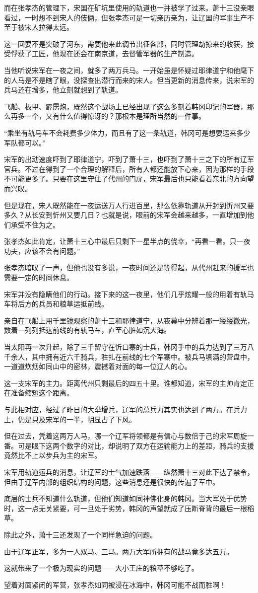 而在张孝杰的管理下，宋国在矿坑里使用的轨道也一并被学了过来。萧十三没亲眼看过，一时想不到宋人的伎俩，但张孝杰可是一切亲历亲为，让辽国的军事生产不至于被宋人拉得太远。

这一回要不是突破了河东，需要他来此调节出征各部，同时管理劫掠来的收获，接受俘获了工匠，他现在还会在南京道，去督管军器的生产制造。

当他听说宋军在一夜之间，就多了两万兵马。一开始虽是怀疑过耶律道宁和他麾下的人马是不是瞎了眼，没探查出潜行而来的宋人。但当更新的消息传来，说宋军的兵马还在增多，他立刻就想到了轨道。

飞船、板甲、霹雳炮，既然这个战场上已经出现了这么多刻着韩冈印记的军器，那么再多一个，又有什么值得惊讶的？那根本是理所当然的一件事。

“乘坐有轨马车不会耗费多少体力，而且有了这一条轨道，韩冈可是想要运来多少军队都可以。”

宋军的出动速度吓到了耶律道宁，吓到了萧十三，也吓到了萧十三之下的所有辽军官兵。不过在得到了一个合理的解释后，所有人都还能放下心来，因为那样的手段不可能更多了。只要在这里守住了代州的门扉，宋军最后也只能看着东北的方向望而兴叹。

但是现在，宋人既然能在一夜运送万人行进百里，那么依靠轨道从开封到忻州又要多久？从长安到忻州又要几日？也就是说，眼前的宋军会越来越多，一直增加到他们承受不住为之。

张孝杰如此肯定，让萧十三心中最后只剩下一星半点的侥幸，“再看一看。只一夜功夫，应该不会有问题。”

张孝杰暗叹了一声，但他也没有多说，一夜时间还是等得起，从代州赶来的援军也需要一定的时间休息。

宋军并没有隐瞒他们的行动。接下来的这一夜里，他们几乎炫耀一般的用着有轨马车将后方的兵员和粮草运抵前线。

亲自在飞船上用千里镜观察的萧十三和耶律道宁，从夜幕中分辨着那一缕缕微光，数着一列列抵达前线的有轨马车，直至心脏如沉大海。

当太阳再一次升起，除了三千留守在忻口寨的士兵，韩冈手中的兵力达到了三万八千余人，其中拥有近六千骑兵，驻扎在前线的七个军寨中。被兵马填满的营盘中，一道道炊烟如同山中的密林，震撼着对面的每一位辽人的心。

这一支宋军的主力。距离代州只剩最后的四五十里。谁都知道，宋军的主帅肯定正在准备缩短这个距离。

与此相对应，经过了昨日的大举增兵，辽军的总兵力其实也达到了两万。在兵力上，仍是只及宋军的一半，明显占了下风。

但在过去，凭着这两万人马，哪一个辽军将领都是有信心与数倍于己的宋军周旋一番。可是眼下这两个数字的对比，却说明了双方在运输能力上的差距，骑兵的支援竟然比不上以步兵为主的宋军。

宋军用轨道运兵的消息，让辽军的士气加速跌落——纵然萧十三对此下达了禁令，但由于辽军内部的组织结构的问题，这些消息还是很快的传遍了军中。

底层的士兵不知道什么轨道，但他们知道如同神佛化身的韩冈。当大军处于优势时，这一点无关紧要，可一旦处于劣势，韩冈的声望就成了压断脊背的最后一根稻草。

除此之外，萧十三还发现了一个同样急迫的问题。

由于辽军正军，多为一人双马、三马。两万大军所拥有的战马竟多达五万。

这就带来了一个极为现实的问题——大小王庄的粮草不够吃了。

望着对面紧闭的军营，张孝杰如同被浸在冰海中，韩冈可能不战而胜啊！
